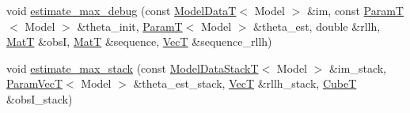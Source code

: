 \begin{DoxyCompactItemize}
\item 
void \hyperlink{classmappel_1_1Estimator_a4a581372a320f1c13eeffacf6309911b}{estimate\+\_\+max\+\_\+debug} (const \hyperlink{namespacemappel_a97f050df953605381ae9c901c3b125f1}{Model\+DataT}$<$ Model $>$ \&im, const \hyperlink{namespacemappel_a667925cb0d6c0e49f2f035cc5a9a6857}{ParamT}$<$ Model $>$ \&theta\+\_\+init, \hyperlink{namespacemappel_a667925cb0d6c0e49f2f035cc5a9a6857}{ParamT}$<$ Model $>$ \&theta\+\_\+est, double \&rllh, \hyperlink{namespacemappel_a7091ab87c528041f7e2027195fad8915}{MatT} \&obsI, \hyperlink{namespacemappel_a7091ab87c528041f7e2027195fad8915}{MatT} \&sequence, \hyperlink{namespacemappel_a2225ad69f358daa3f4f99282a35b9a3a}{VecT} \&sequence\+\_\+rllh)
\item 
void \hyperlink{classmappel_1_1Estimator_aa1b1c2677df2c6ea9fcf67b6a0856e46}{estimate\+\_\+max\+\_\+stack} (const \hyperlink{namespacemappel_aaeb6665bc57476dd93c2df6ad8bc4768}{Model\+Data\+StackT}$<$ Model $>$ \&im\+\_\+stack, \hyperlink{namespacemappel_a0f86d3153e4e27b095012f140eea58de}{Param\+VecT}$<$ Model $>$ \&theta\+\_\+est\+\_\+stack, \hyperlink{namespacemappel_a2225ad69f358daa3f4f99282a35b9a3a}{VecT} \&rllh\+\_\+stack, \hyperlink{namespacemappel_ab2afab4e6c8805e83946670d882768c2}{CubeT} \&obs\+I\+\_\+stack)
\end{DoxyCompactItemize}
